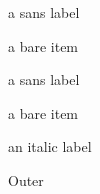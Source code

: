 \documentclass{article}
\begin{document}
\begin{sfdesc}
\item[Sans] a sans label
\end{sfdesc}
\begin{bullets}
\item a bare item
\end{bullets}
\begin{description}[font=\sffamily]
\item[Plain] a sans label
\end{description}
\begin{description}[font=\itshape]
\item a bare item
\item[Lab] an italic label
\end{description}
\begin{description}
\item[Outer] 
\end{description}
\end{document}

